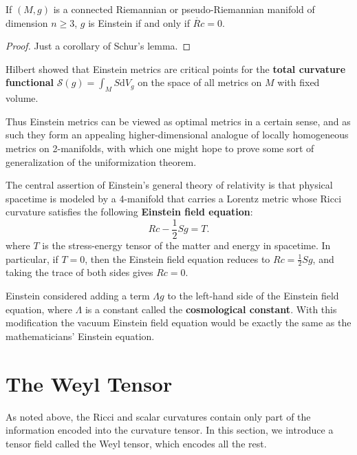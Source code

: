 \documentclass[../main.tex]{subfiles}
\begin{document}
\begin{proposition}{}{}
	If $(M, g)$ is a connected Riemannian or pseudo-Riemannian manifold of dimension $n \geq 3$, $g$ is Einstein if and only if $\mathring{Rc} = 0$.
\end{proposition}
\begin{proof}
	Just a corollary of Schur's lemma.
\end{proof}

\begin{remark}
	Hilbert showed that Einstein metrics are critical points for the \textbf{total curvature functional} $\mathcal{S}(g) = \int_M S \mathrm{d} V_g$ on the space of all metrics on $M$ with fixed volume.

	Thus Einstein metrics can be viewed as optimal metrics in a certain sense, and as such they form an appealing higher-dimensional analogue of locally homogeneous metrics on 2-manifolds, with which one might hope to prove some sort of generalization of the uniformization theorem.
\end{remark}

The central assertion of Einstein’s general theory of relativity is that physical spacetime is modeled by a 4-manifold that carries a Lorentz metric whose Ricci curvature satisfies the following \textbf{Einstein field equation}:
\begin{equation}
	Rc - \frac{1}{2} S g = T.
\end{equation}
where $T$ is the stress-energy tensor of the matter and energy in spacetime. In particular, if $T = 0$, then the Einstein field equation reduces to $Rc = \frac{1}{2} S g$, and taking the trace of both sides gives $Rc = 0$.

Einstein considered adding a term $\Lambda g$ to the left-hand side of the Einstein field equation, where $\Lambda$ is a constant called the \textbf{cosmological constant}. With this modification the vacuum Einstein field equation would be exactly the same as the mathematicians' Einstein equation.

\section{The Weyl Tensor}
As noted above, the Ricci and scalar curvatures contain only part of the information encoded into the curvature tensor. In this section, we introduce a tensor field called the Weyl tensor, which encodes all the rest.
\end{document}
